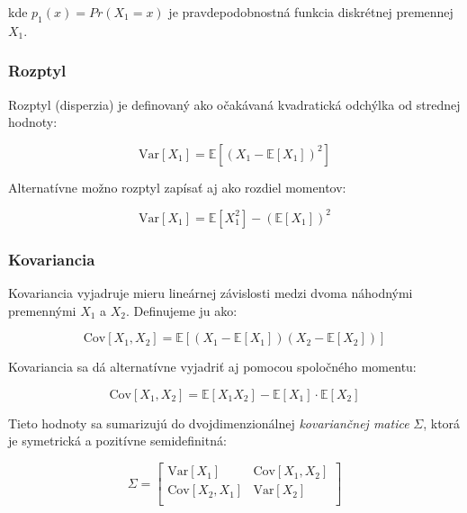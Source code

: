 kde $p_1(x) = Pr(X_1=x)$ je pravdepodobnostná funkcia diskrétnej premennej \(X_1\).

\subsubsection{Rozptyl}\label{subsubsec:joint_variance}

Rozptyl (disperzia) je definovaný ako očakávaná kvadratická odchýlka od strednej hodnoty:

\begin{equation}
\mathrm{Var}[X_1] = \mathbb{E}[(X_1 - \mathbb{E}[X_1])^2]
\end{equation}

Alternatívne možno rozptyl zapísať aj ako rozdiel momentov:

\begin{equation}
\mathrm{Var}[X_1] = \mathbb{E}[X_1^2] - (\mathbb{E}[X_1])^2
\end{equation}

\subsubsection{Kovariancia}\label{subsubsec:joint_covariance}

Kovariancia vyjadruje mieru lineárnej závislosti medzi dvoma náhodnými premennými \(X_1\) a \(X_2\). Definujeme ju ako:

\begin{equation}
\mathrm{Cov}[X_1, X_2] = \mathbb{E}[(X_1 - \mathbb{E}[X_1])(X_2 - \mathbb{E}[X_2])]
\end{equation}

Kovariancia sa dá alternatívne vyjadriť aj pomocou spoločného momentu:

\begin{equation}
\mathrm{Cov}[X_1, X_2] = \mathbb{E}[X_1 X_2] - \mathbb{E}[X_1] \cdot \mathbb{E}[X_2]
\end{equation}

Tieto hodnoty sa sumarizujú do dvojdimenzionálnej \textit{kovariančnej matice} \(\Sigma\), ktorá je symetrická a pozitívne semidefinitná:

\begin{equation}
\Sigma = 
\begin{bmatrix}
\mathrm{Var}[X_1] & \mathrm{Cov}[X_1, X_2] \\
\mathrm{Cov}[X_2, X_1] & \mathrm{Var}[X_2] \\
\end{bmatrix}
\end{equation}

